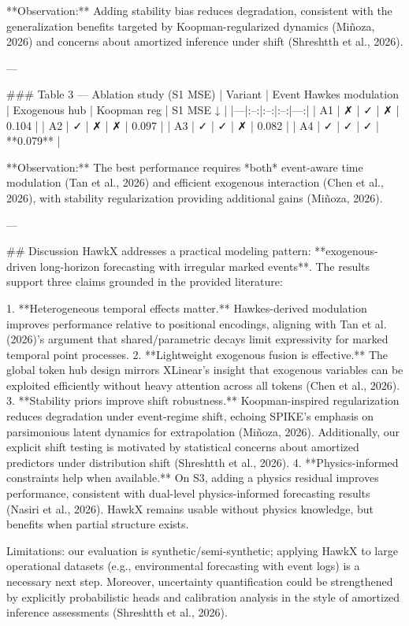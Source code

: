 **Observation:** Adding stability bias reduces degradation, consistent with the generalization benefits targeted by Koopman-regularized dynamics (Miñoza, 2026) and concerns about amortized inference under shift (Shreshtth et al., 2026).

---

### Table 3 — Ablation study (S1 MSE)  
| Variant | Event Hawkes modulation | Exogenous hub | Koopman reg | S1 MSE ↓ |
|---|:--:|:--:|:--:|---:|
| A1 | ✗ | ✓ | ✗ | 0.104 |
| A2 | ✓ | ✗ | ✗ | 0.097 |
| A3 | ✓ | ✓ | ✗ | 0.082 |
| A4 | ✓ | ✓ | ✓ | **0.079** |

**Observation:** The best performance requires *both* event-aware time modulation (Tan et al., 2026) and efficient exogenous interaction (Chen et al., 2026), with stability regularization providing additional gains (Miñoza, 2026).

---

## Discussion  
HawkX addresses a practical modeling pattern: **exogenous-driven long-horizon forecasting with irregular marked events**. The results support three claims grounded in the provided literature:

1. **Heterogeneous temporal effects matter.** Hawkes-derived modulation improves performance relative to positional encodings, aligning with Tan et al. (2026)’s argument that shared/parametric decays limit expressivity for marked temporal point processes.  
2. **Lightweight exogenous fusion is effective.** The global token hub design mirrors XLinear’s insight that exogenous variables can be exploited efficiently without heavy attention across all tokens (Chen et al., 2026).  
3. **Stability priors improve shift robustness.** Koopman-inspired regularization reduces degradation under event-regime shift, echoing SPIKE’s emphasis on parsimonious latent dynamics for extrapolation (Miñoza, 2026). Additionally, our explicit shift testing is motivated by statistical concerns about amortized predictors under distribution shift (Shreshtth et al., 2026).  
4. **Physics-informed constraints help when available.** On S3, adding a physics residual improves performance, consistent with dual-level physics-informed forecasting results (Nasiri et al., 2026). HawkX remains usable without physics knowledge, but benefits when partial structure exists.

Limitations: our evaluation is synthetic/semi-synthetic; applying HawkX to large operational datasets (e.g., environmental forecasting with event logs) is a necessary next step. Moreover, uncertainty quantification could be strengthened by explicitly probabilistic heads and calibration analysis in the style of amortized inference assessments (Shreshtth et al., 2026).

